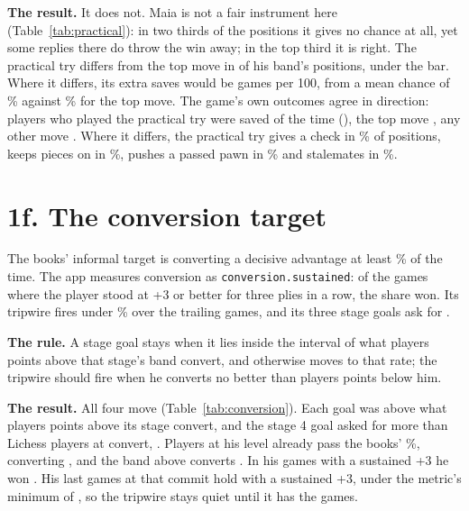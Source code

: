 \documentclass[11pt]{article}
\begin{document}
\textbf{The result.} It does not. Maia is not a fair instrument here (Table~\ref{tab:practical}): in
two thirds of the positions it gives no chance at all, yet some replies there do throw the win away;
in the top third it is right. The practical try differs from the top move in \PracticalHisDiffers{}
of his band's \PracticalHisKept{} positions, under the bar. Where it differs, its extra saves would be
\PracticalHisExtra{} games per 100, from a mean chance of \PracticalChanceTry\% against
\PracticalChanceTop\% for the top move. The game's own outcomes agree in direction: players who
played the practical try were saved \PracticalSavedTry{} of the time (\PracticalSavedTryCount), the
top move \PracticalSavedTop, any other move \PracticalSavedOther. Where it differs, the practical try
gives a check in \PracticalCheck\% of positions, keeps pieces on in \PracticalPiecesOn\%, pushes a
passed pawn in \PracticalPassed\% and stalemates in \PracticalStalemate\%.

\begin{table}[h]
\centering
\scriptsize\PracticalCalibration
\caption{Maia's chance that the opponent's reply throws the win away, by third of the predicted
chance, against the share of actual replies that did.}
\label{tab:practical}
\end{table}

\section{1f. The conversion target}

The books' informal target is converting a decisive advantage at least \BooksTarget\% of the time.
The app measures conversion as \texttt{conversion.sustained}: of the games where the player stood at
+3 or better for three plies in a row, the share won. Its tripwire fires under \TripwireWas\% over
the trailing \TripwireWindow{} games, and its three stage goals ask for \GoalsWas.

\textbf{The rule.} A stage goal stays when it lies inside the interval of what players \LookAbove{}
points above that stage's band convert, and otherwise moves to that rate; the tripwire should fire
when he converts no better than players \LookAbove{} points below him.

\textbf{The result.} All four move (Table~\ref{tab:conversion}). Each goal was above what players
\LookAbove{} points above its stage convert, and the stage 4 goal asked for more than Lichess players
at \ConvTopBand{} convert, \ConvTop. Players at his level already pass the books' \BooksTarget\%,
converting \ConvHis, and the band above converts \ConvAbove. In his \ConvArchiveGames{} games with a sustained +3 he won \ConvArchive.
His last \ConvWindow{} games at that commit hold \ConvWindowSustained{} with a sustained +3,
under the metric's minimum of \ConvWindowMin, so the tripwire stays quiet until it has the games.
\end{document}
